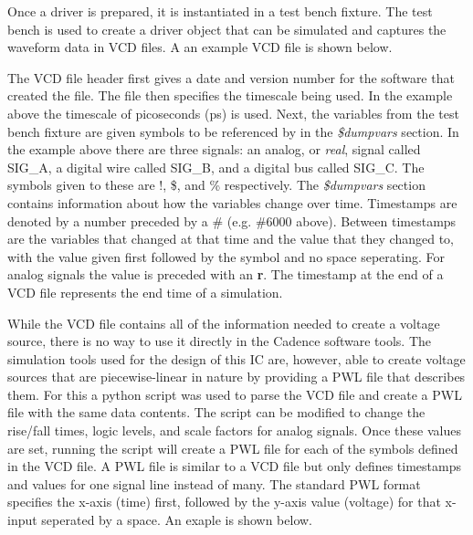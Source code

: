 \documentclass[12pt,oneside,final]{siuethesis}
\theoremstyle{definition}
\begin{document}
\par Once a driver is prepared, it is instantiated in a test bench fixture. The test bench is used to create a driver object that can be simulated and captures the waveform data in VCD files. A an example VCD file is shown below.
 
The VCD file header first gives a date and version number for the software that created the file. The file then specifies the timescale being used. In the example above the timescale of picoseconds (ps) is used. Next, the variables from the test bench fixture are given symbols to be referenced by in the \emph{\$dumpvars} section. In the example above there are three signals: an analog, or \emph{real}, signal called SIG\_A, a digital wire called SIG\_B, and a digital bus called SIG\_C. The symbols given to these are !, \$, and \% respectively. The \emph{\$dumpvars} section contains information about how the variables change over time. Timestamps are denoted by a number preceded by a \# (e.g. \#6000 above). Between timestamps are the variables that changed at that time and the value that they changed to, with the value given first followed by the symbol and no space seperating. For analog signals the value is preceded with an \textbf{r}. The timestamp at the end of a VCD file represents the end time of a simulation.
\par While the VCD file contains all of the information needed to create a voltage source, there is no way to use it directly in the Cadence software tools. The simulation tools used for the design of this IC are, however, able to create voltage sources that are piecewise-linear in nature by providing a PWL file that describes them. For this a python script was used to parse the VCD file and create a PWL file with the same data contents. The script can be modified to change the rise/fall times, logic levels, and scale factors for analog signals. Once these values are set, running the script will create a PWL file for each of the symbols defined in the VCD file. A PWL file is similar to a VCD file but only defines timestamps and values for one signal line instead of many. The standard PWL format specifies the x-axis (time) first, followed by the y-axis value (voltage) for that x-input seperated by a space. An exaple is shown below.
\end{document}
